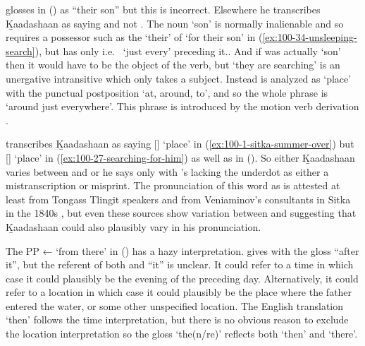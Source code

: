 \citeauthor{swanton:1909} glosses  in (\lastx) as “their son” but this is incorrect.
Elsewhere he transcribes Ḵaadashaan as saying   and not  .
The noun  ‘son’ is normally inalienable and so requires a possessor such as the  ‘their’ of  ‘for their son’ in (\ref{ex:100-34-unsleeping-search}), but  has only  i.e.\  ‘just every’ preceding it..
And if  was actually ‘son’ then it would have to be the object of the verb, but  ‘they are searching’ is an unergative intransitive which only takes a subject.
Instead  is analyzed as  ‘place’ with the punctual postposition  ‘at, around, to’, and so the whole phrase is  ‘around just everywhere’.
This phrase is introduced by the motion verb derivation .

\citeauthor{swanton:1909} transcribes Ḵaadashaan as saying   [] ‘place’ in (\ref{ex:100-1-sitka-summer-over}) but   [] ‘place’ in (\ref{ex:100-27-searching-for-him}) as well as  in (\lastx).
So either Ḵaadashaan varies between  and  or he says only  with \citeauthor{swanton:1909}’s  lacking the underdot as either a mistranscription or misprint.
The pronunciation of this word as  is attested at least from Tongass Tlingit speakers and from Veniaminov’s consultants in Sitka in the 1840s \parencite[03/178]{leer:1973}, but even these sources show variation between  and  suggesting that Ḵaadashaan could also plausibly vary in his pronunciation.

The PP  ←  ‘from there’ in (\lastx) has a hazy interpretation.
\citeauthor{swanton:1909} gives  with the gloss “after it”, but the referent of both  and “it” is unclear.
It could refer to a time in which case it could plausibly be the evening of the preceding day.
Alternatively, it could refer to a location in which case it could plausibly be the place where the father entered the water, or some other unspecified location.
The English translation ‘then’ follows the time interpretation, but there is no obvious reason to exclude the location interpretation so the gloss ‘the(n/re)’ reflects both ‘then’ and ‘there’.

